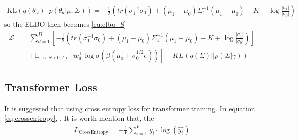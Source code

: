 \begin{align}\label{eq:elbo_7}
\text{KL}(q(\theta_d)||p(\theta_d|\mu,\Sigma))=-\frac{1}{2}\left(tr(\sigma_1^{-1}\sigma_0)+(\mu_1-\mu_0)\Sigma_1^{-1}(\mu_1-\mu_0)-K+\log\frac{|\sigma_1|}{|\sigma_0|}\right)
\end{align}
so the ELBO then becomes \ref{eq:elbo_8}
\begin{align}\label{eq:elbo_8}
\tilde{\mathcal{L}}=&\sum_{d=1}^{D}\left[-\frac{1}{2}\left(tr(\sigma_1^{-1}\sigma_0)+(\mu_1-\mu_0)\Sigma_1^{-1}(\mu_1-\mu_0)-K+\log\frac{|\sigma_1|}{|\sigma_0|}\right)\right]\\
&+\mathbb{E}_{\epsilon\sim\mathcal{N}(0,I)}\left[w_d^\top\log\sigma(\beta(\mu_0+\sigma_0^{1/2}\epsilon))\right]-KL(q(\Sigma)||p(\Sigma|\gamma))
\end{align}
\subsection{Transformer Loss}
It is suggested that using cross entropy loss for transformer training. In equation \ref{eq:crossentropy}, . It is worth mention that, the 
\begin{align}\label{eq:crossentropy}
L_{\text{CrossEntropy}}=-\frac{1}{V}\sum_{i=1}^{V}y_i\cdot\log(\hat{y_i})
\end{align}
